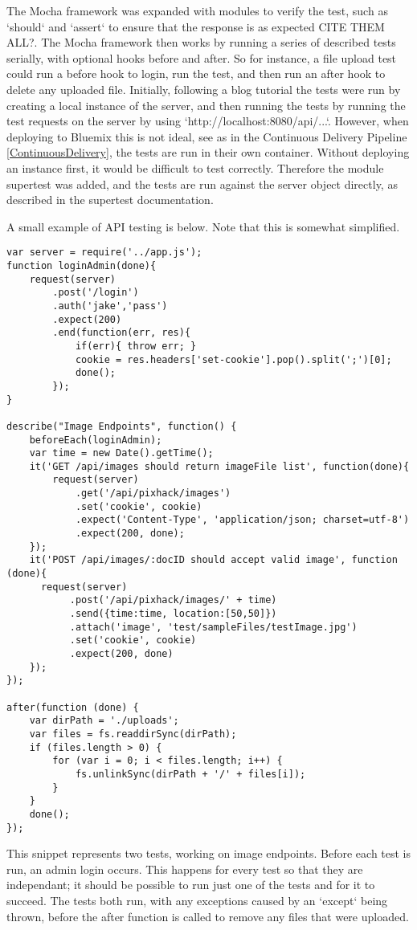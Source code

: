 \documentclass{article}
\begin{document}
The Mocha framework was expanded with modules to verify the test, such as `should` and `assert` to ensure that the response is as expected CITE THEM ALL?. The Mocha framework then works by running a series of described tests serially, with optional hooks before and after. So for instance, a file upload test could run a before hook to login, run the test, and then run an after hook to delete any uploaded file. Initially, following a blog tutorial\cite{thewayofcode} the tests were run by creating a local instance of the server, and then running the tests by running the test requests on the server by using `http://localhost:8080/api/...`. However, when deploying to Bluemix this is not ideal, see as in the Continuous Delivery Pipeline \ref{ContinuousDelivery}, the tests are run in their own container. Without deploying an instance first, it would be difficult to test correctly. Therefore the module supertest was added, and the tests are run against the server object directly, as described in the supertest documentation\cite{supertest}.

A small example of API testing is below. Note that this is somewhat simplified.

\begin{lstlisting}
var server = require('../app.js');
function loginAdmin(done){
	request(server)
		.post('/login')
		.auth('jake','pass')
		.expect(200)
		.end(function(err, res){
			if(err){ throw err; }
			cookie = res.headers['set-cookie'].pop().split(';')[0];
			done();
		});
}

describe("Image Endpoints", function() {
	beforeEach(loginAdmin); 	
	var time = new Date().getTime();
	it('GET /api/images should return imageFile list', function(done){
		request(server)
			.get('/api/pixhack/images')
			.set('cookie', cookie)
			.expect('Content-Type', 'application/json; charset=utf-8')
			.expect(200, done);
	});
	it('POST /api/images/:docID should accept valid image', function (done){
	  request(server)
		   .post('/api/pixhack/images/' + time)
		   .send({time:time, location:[50,50]})
		   .attach('image', 'test/sampleFiles/testImage.jpg')
		   .set('cookie', cookie)
		   .expect(200, done)
	});
});

after(function (done) {
	var dirPath = './uploads';
	var files = fs.readdirSync(dirPath);
	if (files.length > 0) {
		for (var i = 0; i < files.length; i++) {
			fs.unlinkSync(dirPath + '/' + files[i]);
		}
	}
	done();
});
\end{lstlisting}

This snippet represents two tests, working on image endpoints. Before each test is run, an admin login occurs. This happens for every test so that they are independant; it should be possible to run just one of the tests and for it to succeed. The tests both run, with any exceptions caused by an `except` being thrown, before the after function is called to remove any files that were uploaded.  
\end{document}
